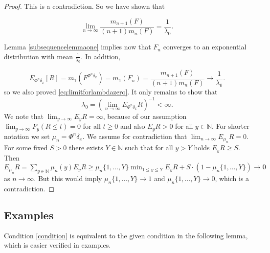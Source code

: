 \documentclass[12pt,a4paper]{scrartcl}
\numberwithin{equation}{section}
\newcommand{\N}{\mathbb{N}} %
\begin{document}
\begin{proof}
This is a contradiction. So we have shown that

$$\lim_{n \to \infty} \frac{m_{n+1}\left(F\right)}{\left(n+1\right) m_n\left(F\right)} = \frac{1}{\lambda_0}.$$

Lemma \ref{subsequencelemmaone} implies now that $ F_n $ converges to an exponential distribution with mean $ \frac{1}{\lambda_0} $. In addition,

$$ E_{\Phi^n\delta_x}\left[R\right] = m_1\left(F^{\Phi^n\delta_x}\right) = m_1\left(F_n\right) = \frac{m_{n+1}\left(F\right)}{\left(n+1\right) m_n\left(F\right)} \to \frac{1}{\lambda_0} .$$
so we also proved \eqref{eq:limitforlambdazero}.
It only remains to show that $$\lambda_0 = \left(\lim_{n \to \infty} E_{\Phi^n\delta_x}R\right)^{-1} < \infty.$$
We note that $ \lim_{y \to \infty} E_y R = \infty $, because of our assumption $ \lim_{y \to \infty} P_y\left(R \leq t\right) = 0$ for all $t \geq 0$ and also $E_y R >0$ for all $y \in \N$. For shorter notation we set $\mu_n = \Phi^n \delta_x $. 
We assume for contradiction that $ \lim_{n \to \infty} E_{\mu_n} R = 0 $. For some fixed $ S > 0 $ there exists $Y \in \N$ such that for all $ y > Y $ holds $ E_y R \geq S $. Then $ E_{\mu_n} R = \sum_{y \in \N} \mu_n\left(y\right) E_y R \geq \mu_n\lbrace 1,\ldots,Y\rbrace  \min_{1 \leq y \leq Y} E_y R + S \cdot \left(1 - \mu_n\lbrace 1,\ldots,Y\rbrace  \right) \to 0$ as $n \to \infty$. But this would imply $ \mu_n\lbrace 1,\ldots,Y\rbrace  \to 1 $ and $ \mu_n\lbrace 1,\ldots,Y\rbrace  \to 0 $, which is a contradiction.


\end{proof}

\subsection{Examples}

Condition \eqref{condition} is equivalent to the given condition in the following lemma, which is easier verified in examples.
\end{document}
